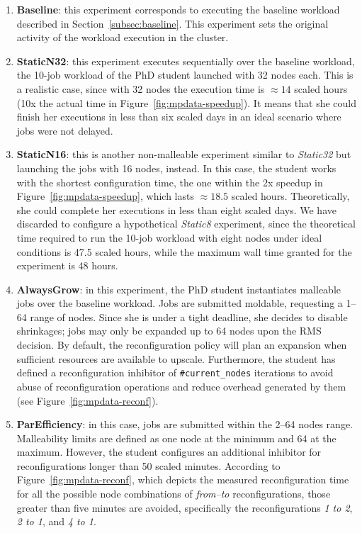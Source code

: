 \documentclass[a4paper,fleqn]{cas-dc}
\begin{document}
\begin{enumerate}[wide]
    \item \textbf{Baseline}: this experiment corresponds to executing the baseline workload described in Section~\ref{subsec:baseline}. This experiment sets the original activity of the workload execution in the cluster.
    \item \textbf{StaticN32}: this experiment executes sequentially over the baseline workload, the 10-job workload of the PhD student launched with 32 nodes each.
    This is a realistic case, since with 32 nodes the execution time is $\approx14$ scaled hours (10x the actual time in Figure~\ref{fig:mpdata-speedup}). It means that she could finish her executions in less than six scaled days in an ideal scenario where jobs were not delayed.
    \item \textbf{StaticN16}: this is another non-malleable experiment similar to \textit{Static32} but launching the jobs with 16 nodes, instead.
    In this case, the student works with the shortest configuration time, the one within the 2x speedup in Figure~\ref{fig:mpdata-speedup}, which lasts $\approx18.5$ scaled hours.
    Theoretically, she could complete her executions in less than eight scaled days.
    We have discarded to configure a hypothetical \textit{Static8} experiment, since the theoretical time required to run the 10-job workload with eight nodes under ideal conditions is 47.5 scaled hours, while the maximum wall time granted for the experiment is 48 hours.
    \item \textbf{AlwaysGrow}: in this experiment, the PhD student instantiates malleable jobs over the baseline workload. Jobs are submitted moldable, requesting a 1--64 range of nodes. 
    Since she is under a tight deadline, she decides to disable shrinkages; jobs may only be expanded up to 64 nodes upon the RMS decision. By default, the reconfiguration policy will plan an expansion when sufficient resources are available to upscale.
    Furthermore, the student has defined a reconfiguration inhibitor of \texttt{\#current\_nodes} iterations to avoid abuse of reconfiguration operations and reduce overhead generated by them (see Figure~\ref{fig:mpdata-reconf}).
    \item \textbf{ParEfficiency}: in this case, jobs are submitted within the 2--64 nodes range.
    Malleability limits are defined as one node at the minimum and 64 at the maximum.
    However, the student configures an additional inhibitor for reconfigurations longer than 50 scaled minutes. 
    According to Figure~\ref{fig:mpdata-reconf}, which depicts the measured reconfiguration time for all the possible node combinations of \textit{from--to} reconfigurations, those greater than five minutes are avoided, specifically the reconfigurations \textit{1 to 2}, \textit{2 to 1}, and \textit{4 to 1}.

\end{enumerate}
\end{document}
